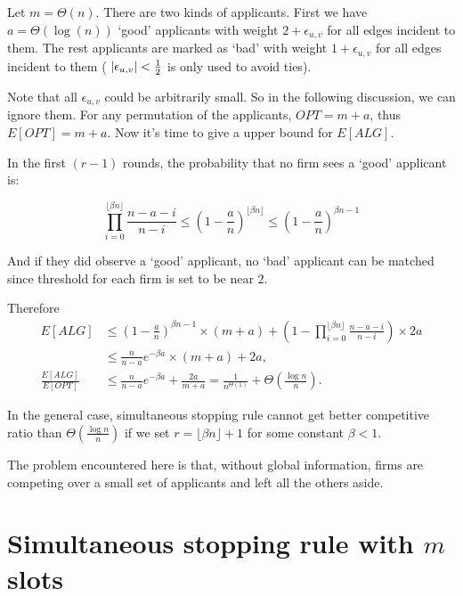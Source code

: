 \begin{example}\label{example1}
    Let $m = \Theta(n)$. There are two kinds of applicants.
    First we have $a = \Theta(\log(n))$ `good' applicants with weight $2 + \epsilon_{u,v}$
    for all edges incident to them.
    The rest applicants are marked as `bad' with weight $1 + \epsilon_{u,v}$
    for all edges incident to them
    ( $\left\vert\epsilon_{u,v}\right\vert < \frac{1}{2}$ is only used to avoid ties).
\end{example}

Note that all $\epsilon_{u,v}$ could be arbitrarily small. So
in the following discussion, we can ignore them.
For any permutation of the applicants, $OPT = m + a$, thus $E[OPT] = m + a$.
Now it's time to give a upper bound for $E[ALG]$.

In the first $(r - 1)$ rounds, the probability that no firm sees
a `good' applicant is:

$$\prod_{i=0}^{\lfloor \beta n \rfloor} \frac{n - a - i}{n - i}
\le (1 - \frac{a}{n})^{\lfloor \beta n \rfloor} \le (1 - \frac{a}{n})^{\beta n - 1}$$

And if they did observe a `good' applicant, no `bad' applicant can be
matched since threshold for each firm is set to be near $2$.

Therefore
\begin{align*}
    E[ALG]  & \le (1 - \frac{a}{n})^{\beta n - 1} \times (m + a)
                + (1 - \prod_{i=0}^{\lfloor \beta n \rfloor} \frac{n - a - i}{n - i}) \times 2a \\
            & \le \frac{n}{n - a} e^{- \beta a} \times (m + a) + 2a,\\
    \frac{E[ALG]}{E[OPT]} & \le \frac{n}{n - a} e^{- \beta a} + \frac{2a}{m+a}
            = \frac{1}{n^{\Theta(1)}} + \Theta(\frac{\log n}{n}).
\end{align*}

\begin{corollary}
In the general case, simultaneous stopping rule cannot get better competitive ratio than $\Theta(\frac{\log n}{n})$
if we set $r = \lfloor \beta n \rfloor + 1$ for some constant $\beta < 1$.
\end{corollary}

The problem encountered here is that, without global information, firms
are competing over a small set of applicants and left all the others aside.


\section{Simultaneous stopping rule with $m$ slots}


